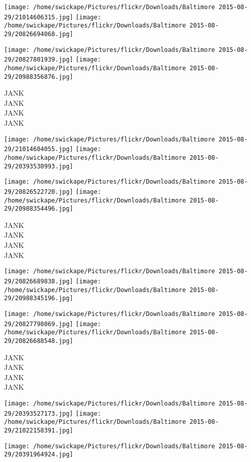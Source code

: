 \documentclass[10pt,letterpaper]{article}
\begin{document}
\texttt{[image: /home/swickape/Pictures/flickr/Downloads/Baltimore 2015-08-29/21014606315.jpg]}
\texttt{[image: /home/swickape/Pictures/flickr/Downloads/Baltimore 2015-08-29/20826694068.jpg]}

\texttt{[image: /home/swickape/Pictures/flickr/Downloads/Baltimore 2015-08-29/20827801939.jpg]}
\texttt{[image: /home/swickape/Pictures/flickr/Downloads/Baltimore 2015-08-29/20988356876.jpg]}

JANK\\
JANK\\
JANK\\
JANK\\
\pagebreak

\texttt{[image: /home/swickape/Pictures/flickr/Downloads/Baltimore 2015-08-29/21014604055.jpg]}
\texttt{[image: /home/swickape/Pictures/flickr/Downloads/Baltimore 2015-08-29/20393530993.jpg]}

\texttt{[image: /home/swickape/Pictures/flickr/Downloads/Baltimore 2015-08-29/20826522720.jpg]}
\texttt{[image: /home/swickape/Pictures/flickr/Downloads/Baltimore 2015-08-29/20988354496.jpg]}

JANK\\
JANK\\
JANK\\
JANK\\
\pagebreak

\texttt{[image: /home/swickape/Pictures/flickr/Downloads/Baltimore 2015-08-29/20826689838.jpg]}
\texttt{[image: /home/swickape/Pictures/flickr/Downloads/Baltimore 2015-08-29/20988345196.jpg]}

\texttt{[image: /home/swickape/Pictures/flickr/Downloads/Baltimore 2015-08-29/20827798069.jpg]}
\texttt{[image: /home/swickape/Pictures/flickr/Downloads/Baltimore 2015-08-29/20826688548.jpg]}

JANK\\
JANK\\
JANK\\
JANK\\
\pagebreak

\texttt{[image: /home/swickape/Pictures/flickr/Downloads/Baltimore 2015-08-29/20393527173.jpg]}
\texttt{[image: /home/swickape/Pictures/flickr/Downloads/Baltimore 2015-08-29/21022158391.jpg]}

\vspace{0.25in}
\texttt{[image: /home/swickape/Pictures/flickr/Downloads/Baltimore 2015-08-29/20391964924.jpg]}
\end{document}
